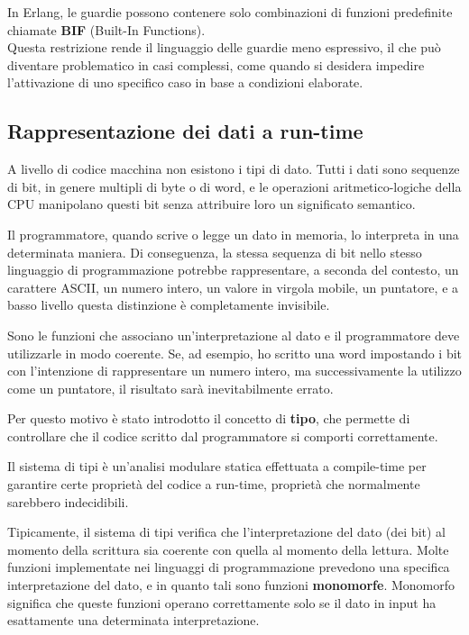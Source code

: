 \documentclass{article}
\begin{document}
In Erlang, le guardie possono contenere solo combinazioni di funzioni predefinite chiamate \textbf{BIF} (Built-In Functions).\\
Questa restrizione rende il linguaggio delle guardie meno espressivo, il che può diventare problematico in casi complessi, come quando si desidera impedire l'attivazione di uno specifico caso in base a condizioni elaborate.

\subsection*{Rappresentazione dei dati a run-time}
A livello di codice macchina non esistono i tipi di dato. Tutti i dati sono sequenze di bit, in genere multipli di byte o di word, e le operazioni aritmetico-logiche della CPU manipolano questi bit senza attribuire loro un significato semantico.

Il programmatore, quando scrive o legge un dato in memoria, lo interpreta in una determinata maniera. Di conseguenza, la stessa sequenza di bit nello stesso linguaggio di programmazione potrebbe rappresentare, a seconda del contesto, un carattere ASCII, un numero intero, un valore in virgola mobile, un puntatore, e a basso livello questa distinzione è completamente invisibile.

Sono le funzioni che associano un'interpretazione al dato e il programmatore deve utilizzarle in modo coerente. Se, ad esempio, ho scritto una word impostando i bit con l'intenzione di rappresentare un numero intero, ma successivamente la utilizzo come un puntatore, il risultato sarà inevitabilmente errato.

Per questo motivo è stato introdotto il concetto di \textbf{tipo}, che permette di controllare che il codice scritto dal programmatore si comporti correttamente.

Il sistema di tipi è un'analisi modulare statica effettuata a compile-time per garantire certe proprietà del codice a run-time, proprietà che normalmente sarebbero indecidibili.

Tipicamente, il sistema di tipi verifica che l'interpretazione del dato (dei bit) al momento della scrittura sia coerente con quella al momento della lettura. Molte funzioni implementate nei linguaggi di programmazione prevedono una specifica interpretazione del dato, e in quanto tali sono funzioni \textbf{monomorfe}. Monomorfo significa che queste funzioni operano correttamente solo se il dato in input ha esattamente una determinata interpretazione.
\end{document}
